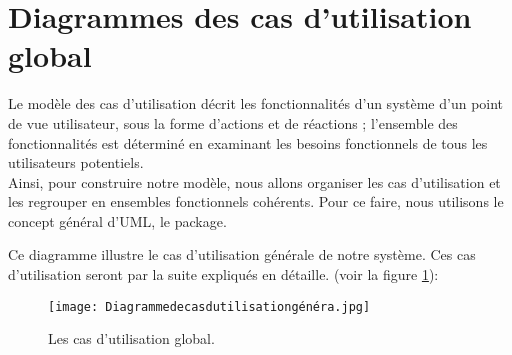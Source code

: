  \bigskip
 





\section{Diagrammes des cas d'utilisation global}
Le modèle des cas d’utilisation décrit les fonctionnalités d’un système d’un point de vue utilisateur, sous la forme d’actions et de réactions ; l’ensemble des fonctionnalités est déterminé en examinant les besoins fonctionnels de tous les utilisateurs potentiels.\\
Ainsi, pour construire notre modèle, nous allons organiser les cas d’utilisation et les regrouper en ensembles fonctionnels cohérents. Pour ce faire, nous utilisons le concept général d’UML, le package.


Ce diagramme illustre le cas d’utilisation générale de notre système. Ces cas d’utilisation seront par la suite expliqués en détaille. (voir la figure \ref{fig:UseCaseAdmin}):
\begin{figure}[ht]
  \centering
  \texttt{[image: Diagrammedecasdutilisationgénéra.jpg]}
  \caption{Les cas d'utilisation global.}
  \label{fig:UseCaseAdmin}
\end{figure}
\FloatBarrier

     
